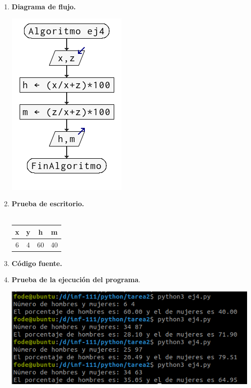 \begin{enumerate}
\begin{enumerate}[\bfseries a)]
    \item \textbf{Diagrama de flujo.}\\
	\begin{center}
	    \includegraphics[scale=.9]{imagenes/tarea2/ej4df.png}
	\end{center}
	\vspace{1cm}

    \item \textbf{Prueba de escritorio.}\\\\
	\begin{center}
	    \begin{tabular}{c|c|c|c}
		x&y&h&m\\
		\hline
		6&4&60&40\\
	    \end{tabular}
	\end{center}
	\vspace{1cm}
    
    \item \textbf{Código fuente.}\\ 
	
	
	\vspace{1cm}
    
    \item \textbf{Prueba de la ejecución del programa}.\\
	\begin{center}
	    \includegraphics[scale=.7]{imagenes/tarea2/ej4.png}
	\end{center}


\end{enumerate}
\end{enumerate}
